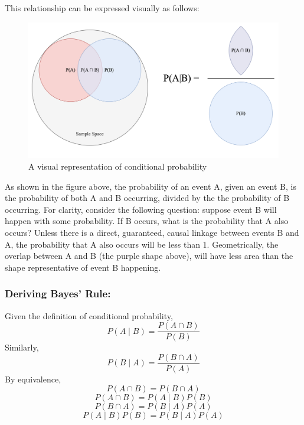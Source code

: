 \documentclass[12pt]{article}
\begin{document}
\noindent This relationship can be expressed visually as follows:\\

\begin{figure}[h!]
\centering
\includegraphics[width=1.0\textwidth]{assets/visual_1.png} 
\caption{A visual representation of conditional probability}
\label{fig:cond_prob}
\end{figure}

\noindent As shown in the figure above, the probability of an event A, given an event B, is the probability of both A and B occurring, divided by the the probability of B occurring. For clarity, consider the following question: suppose event B will happen with some probability. If B occurs, what is the probability that A also occurs? Unless there is a direct, guaranteed, causal linkage between events B and A, the probability that A also occurs will be less than 1. Geometrically, the overlap between A and B (the purple shape above), will have less area than the shape representative of event B happening.

\subsubsection*{Deriving Bayes' Rule:}
Given the definition of conditional probability,
\begin{equation}
P(A \mid B) = \frac{P(A \cap B)}{P(B)}
\end{equation}
Similarly, \\
\begin{equation}
P(B \mid A) = \frac{P(B \cap A)}{P(A)}
\end{equation}
By equivalence, \\
\begin{equation}
P(A \cap B) = P(B \cap A)
\end{equation}
\begin{equation}
P(A \cap B) = P(A \mid B) P(B)
\end{equation}
\begin{equation}
P(B \cap A) = P(B \mid A) P(A)
\end{equation}
\begin{equation}
P(A \mid B) P(B) = P(B \mid A) P(A)
\end{equation} \\
\end{document}
